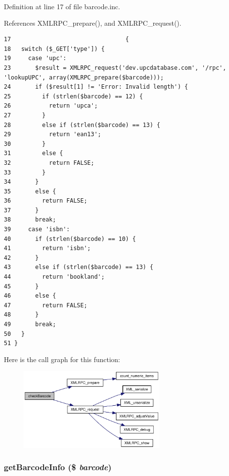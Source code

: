 Definition at line 17 of file barcode.inc.

References XMLRPC\_\-prepare(), and XMLRPC\_\-request().

\begin{Code}\begin{verbatim}17                                 {
18   switch ($_GET['type']) {
19     case 'upc':
23       $result = XMLRPC_request('dev.upcdatabase.com', '/rpc', 'lookupUPC', array(XMLRPC_prepare($barcode)));
24       if ($result[1] != 'Error: Invalid length') {
25         if (strlen($barcode) == 12) {
26           return 'upca';
27         }
28         else if (strlen($barcode) == 13) {
29           return 'ean13';
30         }
31         else {
32           return FALSE;
33         }
34       }
35       else {
36         return FALSE;
37       }
38       break;
39     case 'isbn':
40       if (strlen($barcode) == 10) {
41         return 'isbn';
42       }
43       else if (strlen($barcode) == 13) {
44         return 'bookland';
45       }
46       else {
47         return FALSE;
48       }
49       break;
50   }
51 }
\end{verbatim}
\end{Code}




Here is the call graph for this function:\nopagebreak
\begin{figure}[H]
\begin{center}
\leavevmode
\includegraphics[width=211pt]{barcode_8inc_6d3645af0ef526e4f64d28dcbdceb74f_cgraph}
\end{center}
\end{figure}
\hypertarget{barcode_8inc_e10c37e4f9f9b7c6617a388351a27c99}{
\subsubsection{\setlength{\rightskip}{0pt plus 5cm}getBarcodeInfo (\$ {\em barcode})}}
\label{barcode_8inc_e10c37e4f9f9b7c6617a388351a27c99}


